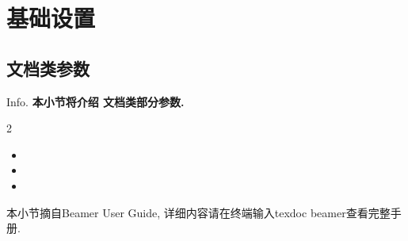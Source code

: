 \section{基础设置}
\subsection{ 文档类参数}
\begin{frame}{Info.}
	\textbf{本小节将介绍  文档类部分参数.}
	\begin{multicols}{2}
		\begin{itemize}
			\item {}
			\item {}
			\item {}
		\end{itemize}
	\end{multicols}
	\vspace{2ex}本小节摘自\textcolor{scugreen}{Beamer User Guide}, 详细内容请在终端输入\alert{\ttfamily texdoc beamer}查看完整手册.
\end{frame}

